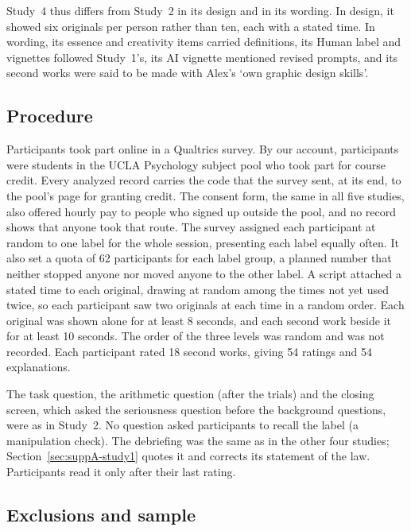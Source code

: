 Study~4 thus differs from Study~2 in its design and in its wording. In design, it showed six originals per person rather than ten, each with a stated time. In wording, its essence and creativity items carried definitions, its Human label and vignettes followed Study~1's, its AI vignette mentioned revised prompts, and its second works were said to be made with Alex's `own graphic design skills'.

\subsection*{Procedure}

Participants took part online in a Qualtrics survey. By our account, participants were students in the UCLA Psychology subject pool who took part for course credit. Every analyzed record carries the code that the survey sent, at its end, to the pool's page for granting credit. The consent form, the same in all five studies, also offered hourly pay to people who signed up outside the pool, and no record shows that anyone took that route. The survey assigned each participant at random to one label for the whole session, presenting each label equally often. It also set a quota of 62 participants for each label group, a planned number that neither stopped anyone nor moved anyone to the other label. A script attached a stated time to each original, drawing at random among the times not yet used twice, so each participant saw two originals at each time in a random order. Each original was shown alone for at least 8 seconds, and each second work beside it for at least 10 seconds. The order of the three levels was random and was not recorded. Each participant rated 18 second works, giving 54 ratings and 54 explanations.

The task question, the arithmetic question (after the trials) and the closing screen, which asked the seriousness question before the background questions, were as in Study~2. No question asked participants to recall the label (a manipulation check). The debriefing was the same as in the other four studies; Section~\ref{sec:suppA-study1} quotes it and corrects its statement of the law. Participants read it only after their last rating.

\subsection*{Exclusions and sample}

